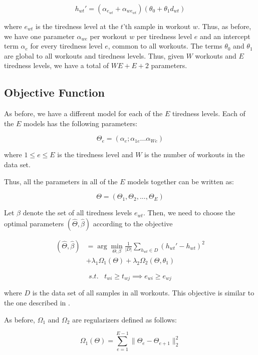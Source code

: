 \documentclass{acm_proc_article-sp}
\begin{document}
\begin{equation}
\label{eqnModelInstHr}
h_{wt}' = (\alpha_{e_{wt}} + \alpha_{we_{wt}})(\theta_0 + \theta_1 d_{wt})
\end{equation}

where $e_{wt}$ is the tiredness level at the $t$'th sample in workout $w$. Thus, as before, we have one parameter $\alpha_{we}$ per workout $w$ per tiredness level $e$ and an intercept term $\alpha_e$ for every tiredness level $e$, common to all workouts. The terms $\theta_0$ and $\theta_1$ are global to all workouts and tiredness levels. Thus, given $W$ workouts and $E$ tiredness levels, we have a total of $WE + E + 2$ parameters.

\subsection{Objective Function}
As before, we have a different model for each of the $E$ tiredness levels. Each of the $E$ models has the following parameters:

$$\Theta_e = (\alpha_e; \alpha_{1e}...\alpha_{We})$$

where $1 \leq e \leq E$ is the tiredness level and $W$ is the number of workouts in the data set.

Thus, all the parameters in all of the $E$ models together can be written as:

$$\Theta = (\Theta_1, \Theta_2,..., \Theta_E)$$

Let $\beta$ denote the set of all tiredness levels $e_{wt}$. Then, we need to choose the optimal parameters $(\hat{\Theta}, \hat{\beta})$ according to the objective

\begin{align}
\label{eqnObjective2}
(\hat{\Theta}, \hat{\beta})  &= \arg\min_{\Theta,\beta}\frac{1}{|D|} \sum_{h_{wt} \in D}(h_{wt}' - h_{wt})^2 \nonumber \\
 & + \lambda_1\Omega_1(\Theta) + \lambda_2\Omega_2(\Theta, \theta_1)
\end{align}

$$s.t. \; \; \; t_{wi} \geq t_{wj} \implies e_{wi} \geq e_{wj} $$

where $D$ is the data set of all samples in all workouts. This objective is similar to the one described in \cite{www13}.

As before, $\Omega_1$ and $\Omega_2$ are regularizers defined as follows:

$$\Omega_1(\Theta) = \sum_{e=1}^{E-1}{\|\Theta_e - \Theta_{e+1}\|_2^2}$$
\end{document}
